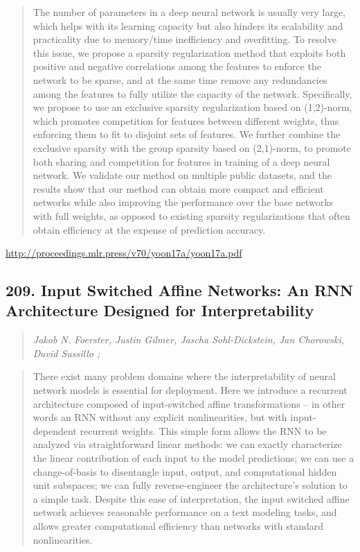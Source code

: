 \documentclass{article}
\begin{document}
\begin{quote}
    The number of parameters in a deep neural network is usually very large, which helps with its learning capacity but also hinders its scalability and practicality due to memory/time inefficiency and overfitting. To resolve this issue, we propose a sparsity regularization method that exploits both positive and negative correlations among the features to enforce the network to be sparse, and at the same time remove any redundancies among the features to fully utilize the capacity of the network. Specifically, we propose to use an exclusive sparsity regularization based on (1,2)-norm, which promotes competition for features between different weights, thus enforcing them to fit to disjoint sets of features. We further combine the exclusive sparsity with the group sparsity based on (2,1)-norm, to promote both sharing and competition for features in training of a deep neural network. We validate our method on multiple public datasets, and the results show that our method can obtain more compact and efficient networks while also improving the performance over the base networks with full weights, as opposed to existing sparsity regularizations that often obtain efficiency at the expense of prediction accuracy.  
\end{quote}

\href{http://proceedings.mlr.press/v70/yoon17a/yoon17a.pdf}{http://proceedings.mlr.press/v70/yoon17a/yoon17a.pdf}

\subsection{209. Input Switched Affine Networks: An RNN Architecture Designed for Interpretability}

\begin{quote}
\footnotesize{\textit{Jakob N. Foerster, Justin Gilmer, Jascha Sohl-Dickstein, Jan Chorowski, David Sussillo ;}}

\end{quote}

\begin{quote}
    There exist many problem domains where the interpretability of neural network models is essential for deployment. Here we introduce a recurrent architecture composed of input-switched affine transformations – in other words an RNN without any explicit nonlinearities, but with input-dependent recurrent weights. This simple form allows the RNN to be analyzed via straightforward linear methods: we can exactly characterize the linear contribution of each input to the model predictions; we can use a change-of-basis to disentangle input, output, and computational hidden unit subspaces; we can fully reverse-engineer the architecture’s solution to a simple task. Despite this ease of interpretation, the input switched affine network achieves reasonable performance on a text modeling tasks, and allows greater computational efficiency than networks with standard nonlinearities.  
\end{quote}
\end{document}

